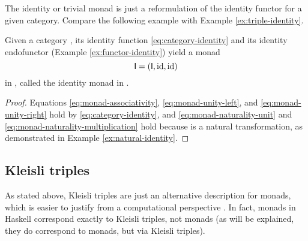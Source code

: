 \begin{example}
  \label{ex:monad-identity}

  The identity or trivial monad is just a reformulation of the
  identity functor for a given category. Compare the following example
  with Example \ref{ex:triple-identity}.

  Given a category , its identity function
  \eqref{eq:category-identity} and its identity endofunctor (Example
  \ref{ex:functor-identity}) yield a monad
  \begin{equation*}
    \mathsf{I} = (\mathsf{I}, \operatorname{id}, \operatorname{id})
  \end{equation*}
  in , called the identity monad in .

  \begin{proof}

    Equations \eqref{eq:monad-associativity},
    \eqref{eq:monad-unity-left}, and \eqref{eq:monad-unity-right} hold
    by \eqref{eq:category-identity}, and
    \eqref{eq:monad-naturality-unit} and
    \eqref{eq:monad-naturality-multiplication} hold because \nat{\id}
    is a natural transformation, as demonstrated in Example
    \ref{ex:natural-identity}.

  \end{proof}

\end{example}

\subsection*{Kleisli triples}

As stated above, Kleisli triples are just an alternative description
for monads, which is easier to justify from a computational
perspective \parencite[60]{moggi-1991}. In fact, monads in Haskell
correspond exactly to Kleisli triples, not monads (as will be
explained, they do correspond to monads, but via Kleisli triples).

